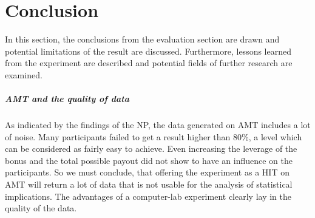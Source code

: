 
\chapter{Conclusion}
\label{ch:Conclusion}

In this section, the conclusions from the evaluation section are drawn and potential limitations of the result are discussed. Furthermore, lessons learned from the experiment are described and potential fields of further research are examined.

\paragraph{\acf{AMT} and the quality of data}
As indicated by the findings of the \acl{NP}, the data generated on \ac{AMT} includes a lot of noise. Many participants failed to get a result higher than 80\%, a level which can be considered as fairly easy to achieve. Even increasing the leverage of the bonus and the total possible payout did not show to have an influence on the participants. So we must conclude, that offering the experiment as a \ac{HIT} on \ac{AMT} will return a lot of data that is not usable for the analysis of statistical implications. The advantages of a computer-lab experiment clearly lay in the quality of the data.

